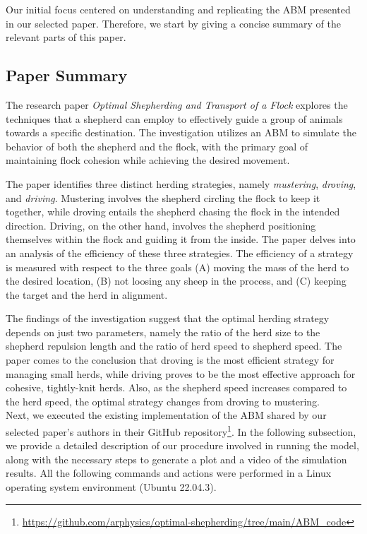 Our initial focus centered on understanding and replicating the ABM presented in our selected paper. Therefore, we start by giving a concise summary of the relevant parts of this paper.

\subsection{Paper Summary}

The research paper \textit{Optimal Shepherding and Transport of a Flock} explores the techniques that a shepherd can employ to effectively guide a group of animals towards a specific destination. The investigation utilizes an ABM to simulate the behavior of both the shepherd and the flock, with the primary goal of maintaining flock cohesion while achieving the desired movement.

The paper identifies three distinct herding strategies, namely \textit{mustering}, \textit{droving}, and \textit{driving}. Mustering involves the shepherd circling the flock to keep it together, while droving entails the shepherd chasing the flock in the intended direction. Driving, on the other hand, involves the shepherd positioning themselves within the flock and guiding it from the inside. The paper delves into an analysis of the efficiency of these three strategies. The efficiency of a strategy is measured with respect to the three goals (A) moving the mass of the herd to the desired location, (B) not loosing any sheep in the process, and (C) keeping the target and the herd in alignment. 

The findings of the investigation suggest that the optimal herding strategy depends on just two parameters, namely the ratio of the herd size to the shepherd repulsion length and the ratio of herd speed to shepherd speed. The paper comes to the conclusion that droving is the most efficient strategy for managing small herds, while driving proves to be the most effective approach for cohesive, tightly-knit herds. Also, as the shepherd speed increases compared to the herd speed, the optimal strategy changes from droving to mustering.\\

Next, we executed the existing implementation of the ABM shared by our selected paper's authors in their GitHub repository\footnote{\url{https://github.com/arphysics/optimal-shepherding/tree/main/ABM_code}}. In the following subsection, we provide a detailed description of our procedure involved in running the model, along with the necessary steps to generate a plot and a video of the simulation results. All the following commands and actions were performed in a Linux operating system environment (Ubuntu 22.04.3).

